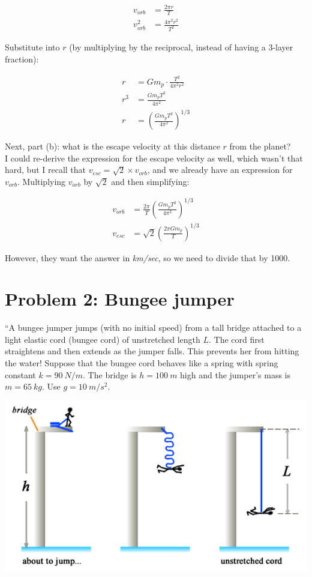 \documentclass[12pt,a4paper]{report}
\begin{document}
\begin{align}
v_{orb} &= \frac{2 \pi r}{T}\\
v_{orb}^2 &= \frac{4 \pi^2 r^2}{T^2}
\end{align}

Substitute into $r$ (by multiplying by the reciprocal, instead of having a 3-layer fraction):

\begin{align}
r &= G m_p \cdot \frac{T^2}{4 \pi^2 r^2}\\
r^3 &= \frac{G m_p T^2}{4 \pi^2}\\
r &= \left(\frac{G m_p T^2}{4 \pi^2}\right)^{1/3}
\end{align}

Next, part (b): what is the escape velocity at this distance $r$ from the planet?\\
I could re-derive the expression for the escape velocity as well, which wasn't that hard, but I recall that $v_{esc} = \sqrt{2} \times v_{orb}$, and we already have an expression for $v_{orb}$. Multiplying $v_{orb}$ by $\sqrt{2}$ and then simplifying:

\begin{align}
v_{orb} &= \frac{2 \pi}{T} \left(\frac{G m_p T^2}{4 \pi^2}\right)^{1/3}\\
v_{esc} &= \sqrt{2} \left(\frac{2 \pi G m_p}{T}\right)^{1/3}
\end{align}

However, they want the answer in \emph{km/sec}, so we need to divide that by 1000.

\section{Problem 2: Bungee jumper}

``A bungee jumper jumps (with no initial speed) from a tall bridge attached to a light elastic cord (bungee cord) of unstretched length $L$. The cord first straightens and then extends as the jumper falls. This prevents her from hitting the water! Suppose that the bungee cord behaves like a spring with spring constant $k = \SI{90}{N/m}$. The bridge is $h = \SI{100}{m}$ high and the jumper's mass is $m = \SI{65}{kg}$. Use $g = \SI{10}{m/s^2}$.

\begin{center}
\includegraphics[scale=0.6]{Graphics/h5p2}
\end{center}
\end{document}
